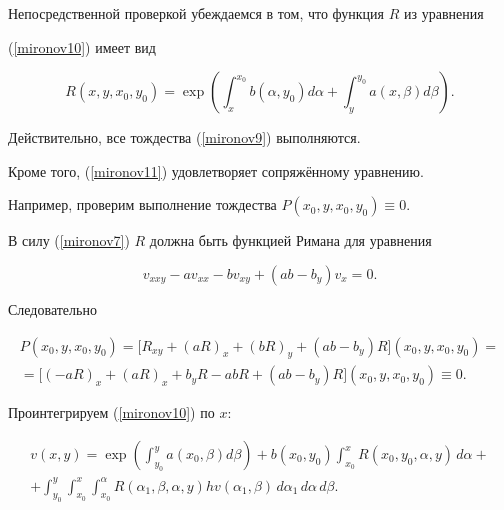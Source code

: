 Непосредственной проверкой убеждаемся в том, что функция $R$ из уравнения


(\ref{mironov10}) имеет вид


\begin{equation}\label{mironov11}


R(x,y,x_{0}, y_{0})=\exp\left ( \int_{x}^{x_{0}} b(\alpha,y_{0})d\alpha+


\int_{y}^{y_{0}} a(x,\beta)d\beta \right ) .


\end{equation}


Действительно, все тождества (\ref{mironov9}) выполняются.


Кроме того, (\ref{mironov11}) удовлетворяет сопряжённому уравнению.


Например, проверим выполнение тождества $P(x_{0}, y,x_{0}, y_{0})\equiv0$.


В силу (\ref{mironov7}) $R$ должна быть функцией Римана для уравнения


$$


v_{xxy}-av_{xx}-bv_{xy}+(ab-b_{y})v_{x}=0.


$$


Следовательно


\begin{multline*}


P(x_{0}, y,x_{0}, y_{0})=


\bigl[R_{xy}+(aR)_{x}+(bR)_{y}+(ab-b_{y})R\bigr](x_{0}, y,x_{0}, y_{0})=\\ 


=\bigl[(-aR)_{x}+(aR)_{x}+b_{y}R-abR+(ab-b_{y})R\bigr](x_{0}, y,x_{0}, y_{0})


\equiv 0.


\end{multline*}





Проинтегрируем (\ref{mironov10}) по $x$:


\begin{multline}\label{mironov12}


v(x,y)=\exp\left( \int_{y_{0}}^{y} a(x_{0}, \beta)d\beta\right)


+b(x_{0}, y_{0})\int_{x_{0}}^{x} R(x_{0}, y_{0}, \alpha,y)\,d\alpha+\\


+\int_{y_{0}}^{y}\int_{x_{0}}^{x}\int_{x_{0}}^{\alpha}


R(\alpha_{1},\beta,\alpha,y) hv(\alpha_{1},\beta)


\,d\alpha_{1} \,d\alpha \,d\beta .


\end{multline}


